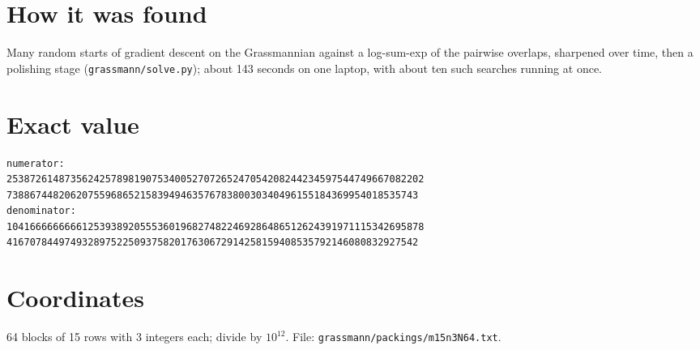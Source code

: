 \documentclass[11pt,a4paper]{article}
\begin{document}
\section{How it was found}
Many random starts of gradient descent on the Grassmannian against a log-sum-exp of the pairwise overlaps, sharpened over time, then a polishing stage (\texttt{grassmann/solve.py}); about 143 seconds on one laptop, with about ten such searches running at once.


\appendix
\section{Exact value}
{\small
\begin{verbatim}
numerator:
253872614873562425789819075340052707265247054208244234597544749667082202
73886744820620755968652158394946357678380030340496155184369954018535743
denominator:
104166666666612539389205553601968274822469286486512624391971115342695878
41670784497493289752250937582017630672914258159408535792146080832927542
\end{verbatim}}

\section{Coordinates}
64 blocks of 15 rows with 3 integers each; divide by $10^{12}$. File: \texttt{grassmann/packings/m15n3N64.txt}.
{\tiny
\begin{multicols}{3}
\end{multicols}}
\end{document}
